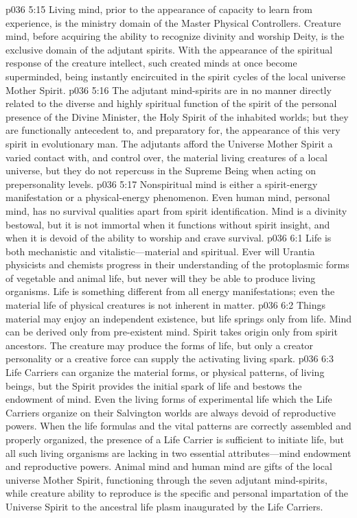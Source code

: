 \vs p036 5:15 Living mind, prior to the appearance of capacity to learn from experience, is the ministry domain of the Master Physical Controllers. Creature mind, before acquiring the ability to recognize divinity and worship Deity, is the exclusive domain of the adjutant spirits. With the appearance of the spiritual response of the creature intellect, such created minds at once become superminded, being instantly encircuited in the spirit cycles of the local universe Mother Spirit.
\vs p036 5:16 The adjutant mind\hyp{}spirits are in no manner directly related to the diverse and highly spiritual function of the spirit of the personal presence of the Divine Minister, the Holy Spirit of the inhabited worlds; but they are functionally antecedent to, and preparatory for, the appearance of this very spirit in evolutionary man. The adjutants afford the Universe Mother Spirit a varied contact with, and control over, the material living creatures of a local universe, but they do not repercuss in the Supreme Being when acting on prepersonality levels.
\pc \vs p036 5:17 Nonspiritual mind is either a spirit\hyp{}energy manifestation or a physical\hyp{}energy phenomenon. Even human mind, personal mind, has no survival qualities apart from spirit identification. Mind is a divinity bestowal, but it is not immortal when it functions without spirit insight, and when it is devoid of the ability to worship and crave survival.
\vs p036 6:1 Life is both mechanistic and vitalistic---material and spiritual. Ever will Urantia physicists and chemists progress in their understanding of the protoplasmic forms of vegetable and animal life, but never will they be able to produce living organisms. Life is something different from all energy manifestations; even the material life of physical creatures is not inherent in matter.
\vs p036 6:2 Things material may enjoy an independent existence, but life springs only from life. Mind can be derived only from pre\hyp{}existent mind. Spirit takes origin only from spirit ancestors. The creature may produce the forms of life, but only a creator personality or a creative force can supply the activating living spark.
\vs p036 6:3 Life Carriers can organize the material forms, or physical patterns, of living beings, but the Spirit provides the initial spark of life and bestows the endowment of mind. Even the living forms of experimental life which the Life Carriers organize on their Salvington worlds are always devoid of reproductive powers. When the life formulas and the vital patterns are correctly assembled and properly organized, the presence of a Life Carrier is sufficient to initiate life, but all such living organisms are lacking in two essential attributes---mind endowment and reproductive powers. Animal mind and human mind are gifts of the local universe Mother Spirit, functioning through the seven adjutant mind\hyp{}spirits, while creature ability to reproduce is the specific and personal impartation of the Universe Spirit to the ancestral life plasm inaugurated by the Life Carriers.
